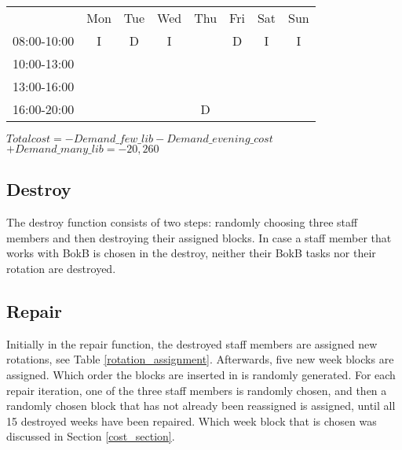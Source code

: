 \begin{table}[!h]
\begin{tabular}{cccccccc}
                                 & Mon                                             & Tue                    & Wed                                            & Thu                    & Fri                                            & Sat                    & Sun                    \\ \cline{2-8} 
\multicolumn{1}{c|}{08:00-10:00} & \multicolumn{1}{c|}{I} & \multicolumn{1}{c|}{\cellcolor[HTML]{FCFF2F}D} & \multicolumn{1}{c|}{I} & \multicolumn{1}{c|}{} & \multicolumn{1}{c|}{\cellcolor[HTML]{FCFF2F}D} & \multicolumn{1}{c|}{I} & \multicolumn{1}{c|}{I} \\ \cline{2-8} 
\multicolumn{1}{c|}{10:00-13:00} & \multicolumn{1}{c|}{}   & \multicolumn{1}{c|}{}  & \multicolumn{1}{c|}{} & \multicolumn{1}{c|}{}  & \multicolumn{1}{c|}{} &     &   \\ \cline{2-6}
\multicolumn{1}{c|}{13:00-16:00} & \multicolumn{1}{c|}{}   & \multicolumn{1}{c|}{}  & \multicolumn{1}{c|}{} & \multicolumn{1}{c|}{}  & \multicolumn{1}{c|}{}         &            &          \\ \cline{2-6}
\multicolumn{1}{c|}{16:00-20:00} & \multicolumn{1}{c|}{}  & \multicolumn{1}{c|}{}  & \multicolumn{1}{c|}{} & \multicolumn{1}{c|}{\cellcolor[HTML]{FCFF2F}D}  & \multicolumn{1}{c|}{} &         &         \\ \cline{2-6}
\end{tabular} 
\newline
$Total cost = -Demand\_few\_lib - Demand\_evening\_cost$
$+ Demand\_many\_lib = -20,260$

\end{table}



\subsection{Destroy}
The destroy function consists of two steps: randomly choosing three staff members and then destroying their assigned blocks. In case a staff member that works with BokB is chosen in the destroy, neither their BokB tasks nor their rotation are destroyed. 

\subsection{Repair} \label{repair}
Initially in the repair function, the destroyed staff members are assigned new rotations, see Table \ref{rotation_assignment}. Afterwards, five new week blocks are assigned. Which order the blocks are inserted in is randomly generated. For each repair iteration, one of the three staff members is randomly chosen, and then a randomly chosen block that has not already been reassigned is assigned, until all 15 destroyed weeks have been repaired. Which week block that is chosen was discussed in Section \ref{cost_section}.


